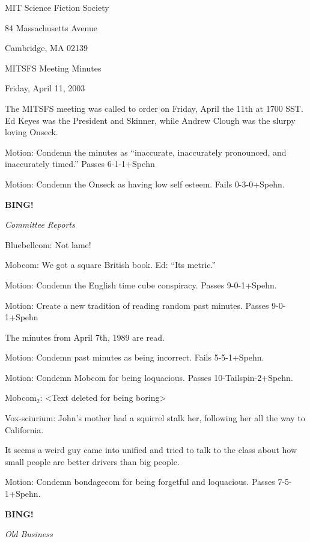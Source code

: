 \documentclass[12pt]{article}
\newcommand{\bing}{{\bf BING!} }
\newcommand{\goto}[1]{\bing \vskip 12pt \centerline{{\em{#1}}}}
\begin{document}
\begin{center}

MIT Science Fiction Society 

84 Massachusetts Avenue

Cambridge, MA 02139

\vspace{12pt}

MITSFS Meeting Minutes 

Friday, April 11, 2003

\end{center}
 
\vspace{18pt}

\setlength{\parskip}{6pt}

\noindent
The MITSFS meeting was called to order on Friday, April the 11th at 1700 SST.  Ed Keyes was the President and Skinner, while Andrew Clough was the slurpy loving Onseck.

Motion:  Condemn the minutes as ``inaccurate, inaccurately pronounced, and inaccurately timed.''  Passes 6-1-1+Spehn

Motion:  Condemn the Onseck as having low self esteem.  Fails 0-3-0+Spehn.

\goto{Committee Reports}

Bluebellcom:  Not lame!

Mobcom:  We got a square British book.  Ed: ``Its metric.''

Motion:  Condemn the English time cube conspiracy. Passes 9-0-1+Spehn.

Motion:  Create a new tradition of reading random past minutes.  Passes 9-0-1+Spehn

The minutes from April 7th, 1989 are read.

Motion:  Condemn past minutes as being incorrect.  Fails 5-5-1+Spehn.

Motion:  Condemn Mobcom for being loquacious.  Passes 10-Tailspin-2+Spehn.

Mobcom$_2$: <Text deleted for being boring>

Vox-sciurium:  John's mother had a squirrel stalk her, following her all the way to California.

It seems a weird guy came into unified and tried to talk to the class about how small people are better drivers than big people. 

Motion:  Condemn bondagecom for being forgetful and loquacious.  Passes 7-5-1+Spehn.

\goto{Old Business}
\end{document}
